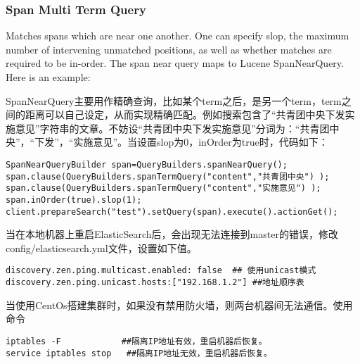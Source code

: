 \subsubsection{Span Multi Term Query}
Matches spans which are near one another. One can specify slop, the maximum number of intervening unmatched positions, as well as whether matches are required to be in-order. The span near query maps to Lucene SpanNearQuery. Here is an example:
\par SpanNearQuery主要用作精确查询，比如某个term之后，是另一个term，term之间的距离可以自己设定，从而实现精确匹配。例如搜索包含了“共青团中央下发实施意见”字符串的文章。不妨设“共青团中央下发实施意见”分词为：“共青团中央”，“下发”，“实施意见”。当设置slop为0，inOrder为true时，代码如下：
\begin{verbatim}
SpanNearQueryBuilder span=QueryBuilders.spanNearQuery();
span.clause(QueryBuilders.spanTermQuery("content","共青团中央") );
span.clause(QueryBuilders.spanTermQuery("content","实施意见") );
span.inOrder(true).slop(1);
client.prepareSearch("test").setQuery(span).execute().actionGet();
\end{verbatim}
\par 当在本地机器上重启ElasticSearch后，会出现无法连接到master的错误，修改config/elasticsearch.yml文件，设置如下值。
\begin{verbatim}
discovery.zen.ping.multicast.enabled: false  ## 使用unicast模式
discovery.zen.ping.unicast.hosts:["192.168.1.2"] ##地址顺序表
\end{verbatim}
当使用CentOs搭建集群时，如果没有禁用防火墙，则两台机器间无法通信。使用命令
\begin{verbatim}
iptables -F            ##隔离IP地址有效，重启机器后恢复。
service iptables stop   ##隔离IP地址无效，重启机器后恢复。
\end{verbatim}
